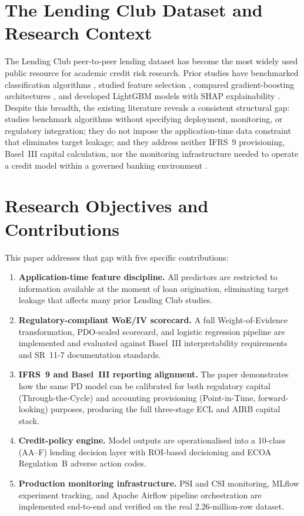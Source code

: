 \documentclass[12pt,a4paper]{report}
\begin{document}
\section{The Lending Club Dataset and Research Context}

The Lending Club peer-to-peer lending dataset \cite{kaggle2018} has become the most widely used public resource for academic credit risk research. Prior studies have benchmarked classification algorithms \cite{gupta2022}, studied feature selection \cite{zhou2019}, compared gradient-boosting architectures \cite{dong2023}, and developed LightGBM models with SHAP explainability \cite{demajo2025}. Despite this breadth, the existing literature reveals a consistent structural gap: studies benchmark algorithms without specifying deployment, monitoring, or regulatory integration; they do not impose the application-time data constraint that eliminates target leakage; and they address neither IFRS~9 provisioning, Basel~III capital calculation, nor the monitoring infrastructure needed to operate a credit model within a governed banking environment \cite{sculley2015}.

\section{Research Objectives and Contributions}

This paper addresses that gap with five specific contributions:

\begin{enumerate}
  \item \textbf{Application-time feature discipline.} All predictors are restricted to information available at the moment of loan origination, eliminating target leakage that affects many prior Lending Club studies.
  \item \textbf{Regulatory-compliant WoE/IV scorecard.} A full Weight-of-Evidence transformation, PDO-scaled scorecard, and logistic regression pipeline are implemented and evaluated against Basel~III interpretability requirements and SR~11-7 documentation standards.
  \item \textbf{IFRS~9 and Basel~III reporting alignment.} The paper demonstrates how the same PD model can be calibrated for both regulatory capital (Through-the-Cycle) and accounting provisioning (Point-in-Time, forward-looking) purposes, producing the full three-stage ECL and AIRB capital stack.
  \item \textbf{Credit-policy engine.} Model outputs are operationalised into a 10-class (AA--F) lending decision layer with ROI-based decisioning and ECOA Regulation~B adverse action codes.
  \item \textbf{Production monitoring infrastructure.} PSI and CSI monitoring, MLflow experiment tracking, and Apache Airflow pipeline orchestration are implemented end-to-end and verified on the real 2.26-million-row dataset.
\end{enumerate}
\end{document}
